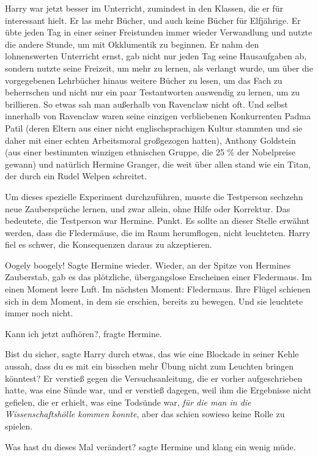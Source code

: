 Harry war jetzt besser im Unterricht, zumindest in den Klassen, die er für
interessant hielt. Er las mehr Bücher, und auch keine Bücher für Elfjährige. Er
übte jeden Tag in einer seiner Freistunden immer wieder Verwandlung und nutzte
die andere Stunde, um mit Okklumentik zu beginnen. Er nahm den lohnenswerten
Unterricht ernst, gab nicht nur jeden Tag seine Hausaufgaben ab, sondern nutzte
seine Freizeit, um mehr zu lernen, als verlangt wurde, um über die vorgegebenen
Lehrbücher hinaus weitere Bücher zu lesen, um das Fach zu beherrschen und nicht
nur ein paar Testantworten auswendig zu lernen, um zu brillieren. So etwas sah
man außerhalb von Ravenclaw nicht oft. Und selbst innerhalb von Ravenclaw waren
seine einzigen verbliebenen Konkurrenten Padma Patil (deren Eltern aus einer
nicht englischsprachigen Kultur stammten und sie daher mit einer echten
Arbeitsmoral großgezogen hatten), Anthony Goldstein (aus einer bestimmten
winzigen ethnischen Gruppe, die 25 \% der Nobelpreise gewann) und natürlich
Hermine Granger, die weit über allen stand wie ein Titan, der durch ein Rudel
Welpen schreitet.

Um dieses spezielle Experiment durchzuführen, musste die Testperson sechzehn
neue Zaubersprüche lernen, und zwar allein, ohne Hilfe oder Korrektur. Das
bedeutete, die Testperson war Hermine. Punkt. Es sollte an dieser Stelle erwähnt
werden, dass die Fledermäuse, die im Raum herumflogen, nicht leuchteten. Harry
fiel es schwer, die Konsequenzen daraus zu akzeptieren.

\glqq Oogely boogely!\grqq{} Sagte Hermine wieder. Wieder, an der Spitze von
Hermines Zauberstab, gab es das plötzliche, übergangslose Erscheinen einer
Fledermaus. Im einen Moment leere Luft. Im nächsten Moment: Fledermaus. Ihre
Flügel schienen sich in dem Moment, in dem sie erschien, bereits zu bewegen. Und
sie leuchtete immer noch nicht.

\glqq Kann ich jetzt aufhören?\grqq{}, fragte Hermine.

\glqq Bist du sicher\grqq{}, sagte Harry durch etwas, das wie eine Blockade in
seiner Kehle aussah, \glqq dass du es mit ein bisschen mehr Übung nicht zum
Leuchten bringen könntest?\grqq{} Er verstieß gegen die Versuchsanleitung, die
er vorher aufgeschrieben hatte, was eine Sünde war, und er verstieß dagegen,
weil ihm die Ergebnisse nicht gefielen, die er erhielt, was eine Todsünde war,
\emph{für die man in die Wissenschaftshölle kommen konnte}, aber das schien
sowieso keine Rolle zu spielen.

\glqq Was hast du dieses Mal verändert?\grqq{} sagte Hermine und klang ein wenig
müde.

